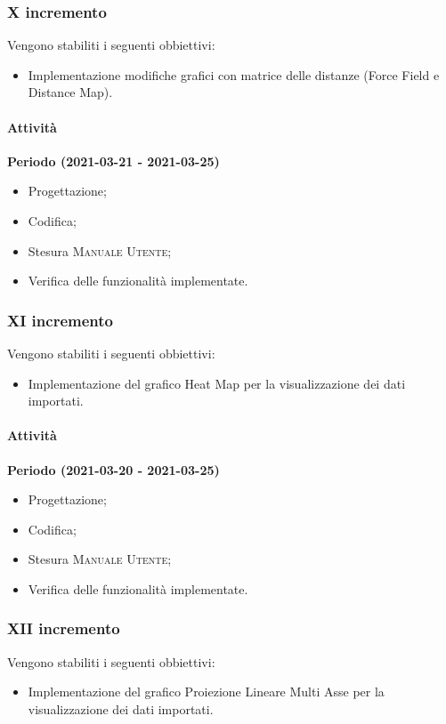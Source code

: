 \documentclass[../piano_di_progetto.tex]{subfiles}
\begin{document}
\subsubsection{X incremento}
Vengono stabiliti i seguenti obbiettivi:
\begin{itemize}
    \item Implementazione modifiche grafici con matrice delle distanze (Force Field e Distance Map).
\end{itemize}
\paragraph{Attività}
\noindent\textbf{Periodo (2021-03-21 - 2021-03-25)}
\begin{itemize}
    \item Progettazione;
    \item Codifica;
    \item Stesura \textsc{Manuale Utente};
    \item Verifica delle funzionalità implementate.
\end{itemize}

\subsubsection{XI incremento}
Vengono stabiliti i seguenti obbiettivi:
\begin{itemize}
    \item Implementazione del grafico Heat Map per la visualizzazione dei dati importati.
\end{itemize}
\paragraph{Attività}
\noindent\textbf{Periodo (2021-03-20 - 2021-03-25)}
\begin{itemize}
    \item Progettazione;
    \item Codifica;
    \item Stesura \textsc{Manuale Utente};
    \item Verifica delle funzionalità implementate.
\end{itemize}


\subsubsection{XII incremento}
Vengono stabiliti i seguenti obbiettivi:
\begin{itemize}
    \item Implementazione del grafico Proiezione Lineare Multi Asse per la visualizzazione dei dati importati.
\end{itemize}
\end{document}
